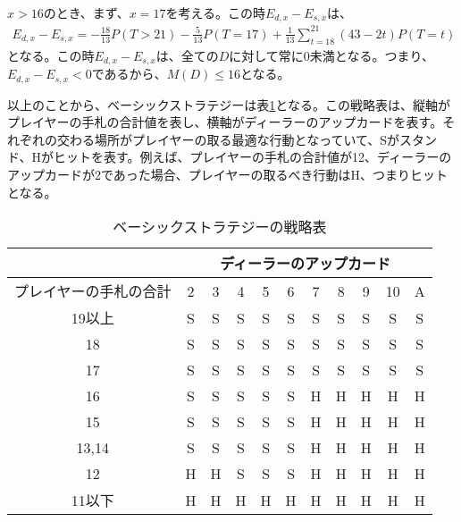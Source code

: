         \subsubsection{}
            $x>16$のとき、まず、$x=17$を考える。この時$E_{d,x}-E_{s,x}$は、
            \begin{displaymath}
                \begin{split}
                    E_{d,x}-E_{s,x}=-\frac{18}{13}P(T>21)-\frac{5}{13}P(T=17)+\frac{1}{13}\sum_{t=18}^21(43-2t)P(T=t)
                \end{split}
            \end{displaymath}
            となる。この時$E_{d,x}-E_{s,x}$は、全ての$D$に対して常に0未満となる。つまり、$E_{d,x}-E_{s,x}<0$であるから、$M(D)\leq 16$となる。
        
        以上のことから、ベーシックストラテジーは表\ref{basicstrategytable}となる。この戦略表は、縦軸がプレイヤーの手札の合計値を表し、横軸がディーラーのアップカードを表す。それぞれの交わる場所がプレイヤーの取る最適な行動となっていて、Sがスタンド、Hがヒットを表す。例えば、プレイヤーの手札の合計値が12、ディーラーのアップカードが2であった場合、プレイヤーの取るべき行動はH、つまりヒットとなる。
        \begin{table}[H]
            \begin{center}
            \label{basicstrategytable}
            \caption{ベーシックストラテジーの戦略表}
            \begin{tabular}{|c|c|c|c|c|c|c|c|c|c|c|}
            \hline
                        & \multicolumn{10}{c|}{ディーラーのアップカード}     \\ \hline
            プレイヤーの手札の合計 & 2 & 3 & 4 & 5 & 6 & 7 & 8 & 9 & 10 & A \\ \hline
            19以上        & S & S & S & S & S & S & S & S & S  & S \\ \hline
            18          & S & S & S & S & S & S & S & S & S  & S \\ \hline
            17          & S & S & S & S & S & S & S & S & S  & S \\ \hline
            16          & S & S & S & S & S & H & H & H & H  & H \\ \hline
            15          & S & S & S & S & S & H & H & H & H  & H \\ \hline
            13,14       & S & S & S & S & S & H & H & H & H  & H \\ \hline
            12          & H & H & S & S & S & H & H & H & H  & H \\ \hline
            11以下        & H & H & H & H & H & H & H & H & H  & H \\ \hline
            \end{tabular}
            \end{center}
            \end{table}
    